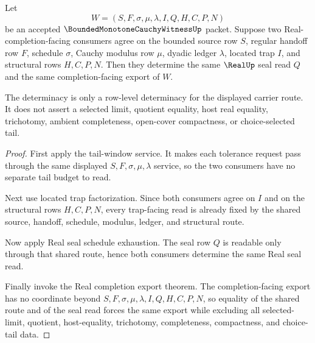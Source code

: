 \begin{theorem}
\label{thm:bounded-monotone-cauchy-witness-seal-trap-budget-determinacy}
Let
$$
W=(S,F,\sigma,\mu,\lambda,I,Q,H,C,P,N)
$$
be an accepted $\BoundedMonotoneCauchyWitnessUp$ packet. Suppose two Real-completion-facing consumers agree on the bounded source row $S$, regular handoff row $F$, schedule $\sigma$, Cauchy modulus row $\mu$, dyadic ledger $\lambda$, located trap $I$, and structural rows $H,C,P,N$. Then they determine the same $\RealUp$ seal read $Q$ and the same completion-facing export of $W$.

The determinacy is only a row-level determinacy for the displayed carrier route. It does not assert a selected limit, quotient equality, host real equality, trichotomy, ambient completeness, open-cover compactness, or choice-selected tail.
\end{theorem}
\begin{proof}
First apply the tail-window service. It makes each tolerance request pass through the same displayed $S,F,\sigma,\mu,\lambda$ service, so the two consumers have no separate tail budget to read.

Next use located trap factorization. Since both consumers agree on $I$ and on the structural rows $H,C,P,N$, every trap-facing read is already fixed by the shared source, handoff, schedule, modulus, ledger, and structural route.

Now apply Real seal schedule exhaustion. The seal row $Q$ is readable only through that shared route, hence both consumers determine the same Real seal read.

Finally invoke the Real completion export theorem. The completion-facing export has no coordinate beyond $S,F,\sigma,\mu,\lambda,I,Q,H,C,P,N$, so equality of the shared route and of the seal read forces the same export while excluding all selected-limit, quotient, host-equality, trichotomy, completeness, compactness, and choice-tail data.
\end{proof}

